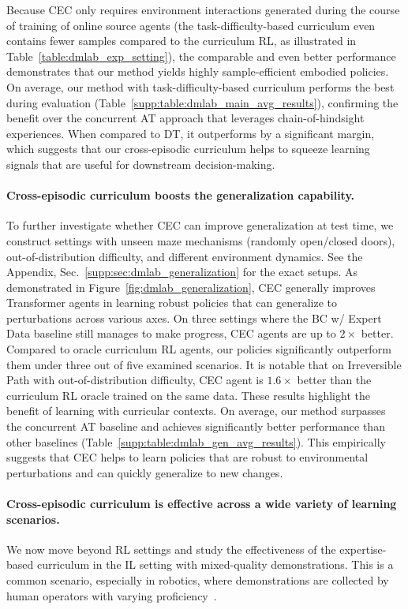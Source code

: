 \documentclass{article}
\newcommand{\para}[1]{\paragraph{#1}\looseness=-1}
\newcommand{\cec}[0]{\mbox{CEC}\xspace}
\begin{document}
Because \cec only requires environment interactions generated during the course of training of online source agents (the task-difficulty-based curriculum even contains fewer samples compared to the curriculum RL, as illustrated in Table~\ref{table:dmlab_exp_setting}), the comparable and even better performance demonstrates that our method yields highly sample-efficient embodied policies.
On average, our method with task-difficulty-based curriculum performs the best during evaluation (Table~\ref{supp:table:dmlab_main_avg_results}), confirming the benefit over the concurrent AT approach that leverages chain-of-hindsight experiences. When compared to DT, it outperforms by a significant margin, which suggests that our cross-episodic curriculum helps to squeeze learning signals that are useful for downstream decision-making.
\vspace{-0.5em}
\para{Cross-episodic curriculum boosts the generalization capability.}
To further investigate whether \cec can improve generalization at test time, we construct settings with unseen maze mechanisms (randomly open/closed doors), out-of-distribution difficulty, and different environment dynamics.
See the Appendix, Sec.~\ref{supp:sec:dmlab_generalization} for the exact setups.
As demonstrated in Figure~\ref{fig:dmlab_generalization}, \cec generally improves Transformer agents in learning robust policies that can generalize to perturbations across various axes.
On three settings where the BC w/ Expert Data baseline still manages to make progress, \cec agents are up to $2\times$ better.
Compared to oracle curriculum RL agents, our policies significantly outperform them under three out of five examined scenarios.
It is notable that on Irreversible Path with out-of-distribution difficulty, \cec agent is $1.6\times$ better than the curriculum RL oracle trained on the same data.
These results highlight the benefit of learning with curricular contexts.
On average, our method surpasses the concurrent AT baseline and achieves significantly better performance than other baselines (Table~\ref{supp:table:dmlab_gen_avg_results}). This empirically suggests that CEC helps to learn policies that are robust to environmental perturbations and can quickly generalize to new changes.

\vspace{-0.5em}
\para{Cross-episodic curriculum is effective across a wide variety of learning scenarios.}
We now move beyond RL settings and study the effectiveness of the expertise-based curriculum in the IL setting with mixed-quality demonstrations.
This is a common scenario, especially in robotics, where demonstrations are collected by human operators with varying proficiency~\citep{mandlekar2018roboturk}.
\end{document}
